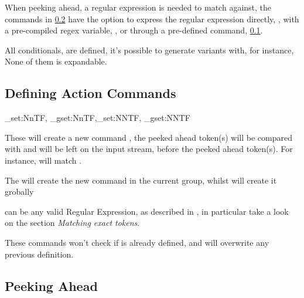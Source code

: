 \documentclass[10pt]{article}
\begin{document}
When peeking ahead, a regular expression is needed to match against, the commands in \ref{peek-expl3}  have the option to express the regular expression directly, , with a pre-compiled regex variable, ,  or through a pre-defined command, \ref{cmd-def-expl3}.
\begin{tsremark}
All conditionals,  are defined, it's possible to generate variants with, for instance,  None of them is expandable.
\end{tsremark}


\subsection{Defining Action Commands}\label{cmd-def-expl3}
 
\begin{codedescribe}[code,update=2025/10/07]{\xpeekahead_set:NnTF, \xpeekahead_gset:NnTF,\xpeekahead_set:NNTF, \xpeekahead_gset:NNTF}
\begin{codesyntax}%
\end{codesyntax}
These will create a new command , the peeked ahead token(s) will be compared with  and  will be left on the input stream, before the peeked ahead token(s). For instance,  will match \tsobj[xverb]{\begin{envx}}.

The  will create the new command in the current group, whilst   will create it grobally
\end{codedescribe}
\begin{tsremark}
   can be any valid Regular Expression, as described in \cite{expl3}, in particular take a look on the section \emph{Matching exact tokens}.
\end{tsremark}
\begin{tsremark}
  These commands won't check if  is already defined, and will overwrite any previous definition.
\end{tsremark}


\subsection{Peeking Ahead}\label{peek-expl3}
\end{document}
